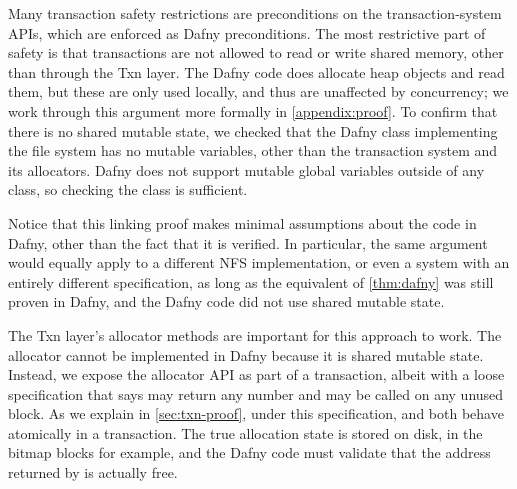 Many transaction safety restrictions are preconditions on the
transaction-system APIs, which are enforced as Dafny preconditions.  The most
restrictive part of safety is that transactions are not allowed to read or write
shared memory, other than through the Txn layer. The Dafny code does allocate
heap objects and read them, but these are only used locally, and thus are
unaffected by concurrency; we work through this argument more formally in
\autoref{appendix:proof}. To confirm that there is no shared mutable state, we
checked that the Dafny class implementing the file system has no mutable
variables, other than the transaction system and its allocators.  Dafny does not
support mutable global variables outside of any class, so checking the class is sufficient.

Notice that this linking proof makes minimal assumptions about the code in
Dafny, other than the fact that it is verified. In particular, the same argument
would equally apply to a different NFS implementation, or even a system with an
entirely different specification, as long as the equivalent of
\autoref{thm:dafny} was still proven in Dafny, and the Dafny code did not use
shared mutable state.


The Txn layer's allocator methods are important for this approach to work.
The allocator cannot be implemented in Dafny because it is shared mutable state.
Instead, we expose the allocator API as part of a transaction, albeit with a loose
specification that says  may return
any number and  may be called on any unused block.
As we explain in \autoref{sec:txn-proof}, under this specification,  and  both behave
atomically in a transaction. The
true allocation state is stored on disk, in the bitmap blocks for
example, and the Dafny code must validate that the address returned by  is actually
free.

